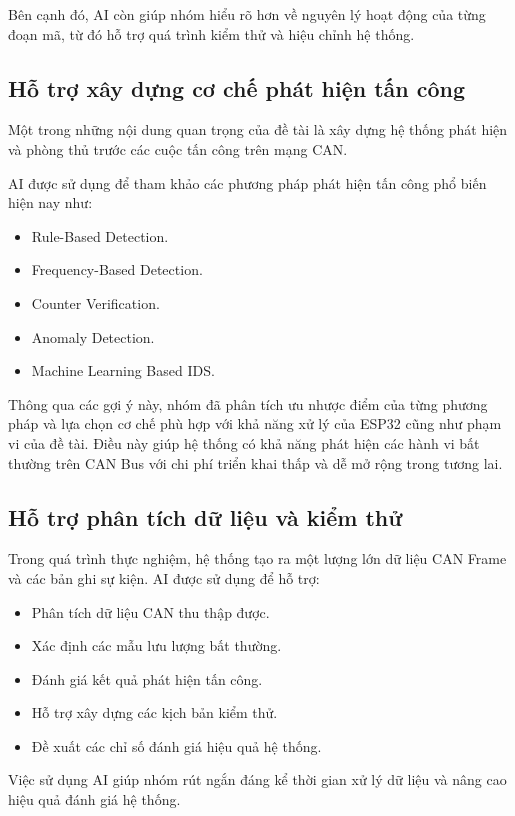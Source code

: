 Bên cạnh đó, AI còn giúp nhóm hiểu rõ hơn về nguyên lý hoạt động của từng đoạn mã, từ đó hỗ trợ quá trình kiểm thử và hiệu chỉnh hệ thống.

\subsection{Hỗ trợ xây dựng cơ chế phát hiện tấn công}

Một trong những nội dung quan trọng của đề tài là xây dựng hệ thống phát hiện và phòng thủ trước các cuộc tấn công trên mạng CAN.

AI được sử dụng để tham khảo các phương pháp phát hiện tấn công phổ biến hiện nay như:

\begin{itemize}
	\item Rule-Based Detection.
	\item Frequency-Based Detection.
	\item Counter Verification.
	\item Anomaly Detection.
	\item Machine Learning Based IDS.
\end{itemize}

Thông qua các gợi ý này, nhóm đã phân tích ưu nhược điểm của từng phương pháp và lựa chọn cơ chế phù hợp với khả năng xử lý của ESP32 cũng như phạm vi của đề tài. Điều này giúp hệ thống có khả năng phát hiện các hành vi bất thường trên CAN Bus với chi phí triển khai thấp và dễ mở rộng trong tương lai.

\subsection{Hỗ trợ phân tích dữ liệu và kiểm thử}

Trong quá trình thực nghiệm, hệ thống tạo ra một lượng lớn dữ liệu CAN Frame và các bản ghi sự kiện. AI được sử dụng để hỗ trợ:

\begin{itemize}
	\item Phân tích dữ liệu CAN thu thập được.
	\item Xác định các mẫu lưu lượng bất thường.
	\item Đánh giá kết quả phát hiện tấn công.
	\item Hỗ trợ xây dựng các kịch bản kiểm thử.
	\item Đề xuất các chỉ số đánh giá hiệu quả hệ thống.
\end{itemize}

Việc sử dụng AI giúp nhóm rút ngắn đáng kể thời gian xử lý dữ liệu và nâng cao hiệu quả đánh giá hệ thống.

